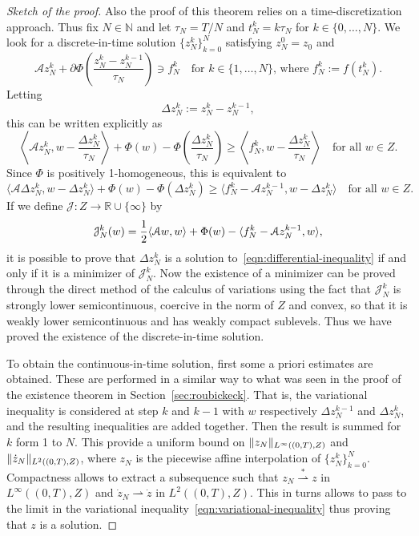 \documentclass[a4paper,10pt,oneside]{amsbook}
\numberwithin{section}{chapter}
\numberwithin{equation}{chapter}
\theoremstyle{definition}
\DeclarePairedDelimiter{\norm}{\lVert}{\rVert}
\DeclarePairedDelimiter{\dual}{\langle}{\rangle}
\begin{document}
\begin{proof}[Sketch of the proof]
Also the proof of this theorem relies on a time-discretization approach. Thus fix $N\in\mathbb{N}$ and let $\tau_N=T/N$ and $t_N^k=k\tau_N$ for $k\in\{0,\dots,N\}$. We look for a discrete-in-time solution $\{z_N^k\}_{k=0}^N$ satisfying $z_N^0=z_0$ and
\[
\mathcal{A}z_N^k+\partial\Phi\left(\frac{z_N^k-z_N^{k-1}}{\tau_N}\right)\ni f_N^k\quad\text{for $k\in\{1,\dots,N\}$, where $f_N^k:=f(t_N^k)$.}
\]
Letting
\[
\Delta z_N^k:=z_N^k-z_N^{k-1},
\]
this can be written explicitly as
\[
\left\langle\mathcal{A}z_N^k,w-\frac{\Delta z_N^k}{\tau_N}\right\rangle+\Phi(w)-\Phi\left(\frac{\Delta z_N^k}{\tau_N}\right)\ge\left\langle f_N^k,w-\frac{\Delta z_N^k}{\tau_N}\right\rangle\quad\text{for all $w\in Z$}.
\]
Since $\Phi$ is positively 1-homogeneous, this is equivalent to
\begin{equation}
\label{eqn:differential-inequality}
\langle\mathcal{A}\Delta z_N^k,w-\Delta z_N^k\rangle+\Phi(w)-\Phi(\Delta z_N^k)\ge\langle f_N^k-\mathcal{A}z_N^{k-1},w-\Delta z_N^k\rangle\quad\text{for all $w\in Z$}.
\end{equation}
If we define $\mathcal{J}\colon Z\to\mathbb{R}\cup\{\infty\}$ by
\[
\mathcal{J}_N^k(w)=\frac{1}{2}\dual{\mathcal{A}w,w}+\Phi(w)-\dual{f_N^k-\mathcal{A}z_N^{k-1},w},
\]
it is possible to prove that $\Delta z_N^k$ is a solution to~\eqref{eqn:differential-inequality} if and only if it is a minimizer of $\mathcal{J}_N^k$. Now the existence of a minimizer can be proved through the direct method of the calculus of variations using the fact that $\mathcal{J}_N^k$ is strongly lower semicontinuous, coercive in the norm of $Z$ and convex, so that it is weakly lower semicontinuous and has weakly compact sublevels. Thus we have proved the existence of the discrete-in-time solution.

To obtain the continuous-in-time solution, first some a priori estimates are obtained. These are performed in a similar way to what was seen in the proof of the existence theorem in Section~\ref{sec:roubickeck}. That is, the variational inequality is considered at step $k$ and $k-1$ with $w$ respectively $\Delta z_N^{k-1}$ and $\Delta z_N^k$, and the resulting inequalities are added together. Then the result is summed for $k$ form 1 to $N$. This provide a uniform bound on $\norm{z_N}_{L^\infty((0,T),Z)}$ and $\norm{\dot z_N}_{L^2((0,T),Z)}$, where $z_N$ is the piecewise affine interpolation of $\{z_N^k\}_{k=0}^N$. Compactness allows to extract a subsequence such that $z_N\overset{*}{\rightharpoonup}z$ in $L^\infty((0,T),Z)$ and $\dot z_N\rightharpoonup\dot z$ in $L^2((0,T),Z)$. This in turns allows to pass to the limit in the variational inequality~\eqref{eqn:variational-inequality} thus proving that $z$ is a solution.
\end{proof}
\end{document}
